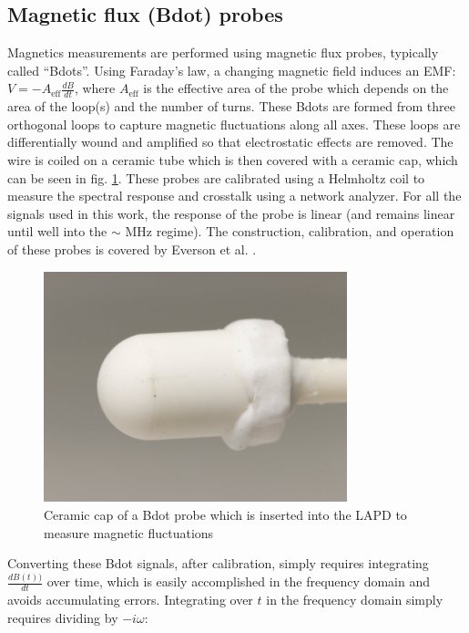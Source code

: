 \subsection{Magnetic flux (Bdot) probes}

Magnetics measurements are performed using magnetic flux probes, typically called ``Bdots''. Using Faraday's law, a changing magnetic field induces an EMF: $V = - A_\text{eff} \frac{dB}{dt}$, where $A_\text{eff}$ is the effective area of the probe which depends on the area of the loop(s) and the number of turns. These Bdots are formed from three orthogonal loops to capture magnetic fluctuations along all axes. These loops are differentially wound and amplified so that electrostatic effects are removed. The wire is coiled on a ceramic tube which is then covered with a ceramic cap, which can be seen in fig. \ref{fig:bdot-cap}. These probes are calibrated using a Helmholtz coil to measure the spectral response and crosstalk using a network analyzer. For all the signals used in this work, the response of the probe is linear (and remains linear until well into the $\sim$ MHz regime). The construction, calibration, and operation of these probes is covered by Everson et al. \cite{Everson_design_2009}.

\begin{figure}
	\centering
	\includegraphics[width=250pt]{figures/bdot_cap.jpg}
	\caption[Ceramic cap of a Bdot probe]{\label{fig:bdot-cap}Ceramic cap of a Bdot probe which is inserted into the LAPD to measure magnetic fluctuations}
\end{figure}

Converting these Bdot signals, after calibration, simply requires integrating $\frac{dB(t))}{dt}$ over time, which is easily accomplished in the frequency domain and avoids accumulating errors. Integrating over $t$ in the frequency domain simply requires dividing by $-i\omega$:

